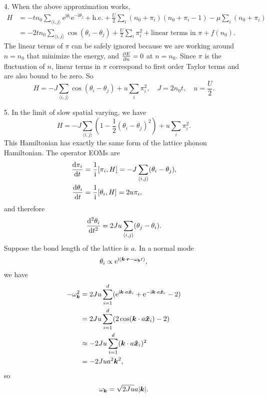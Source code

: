 \documentclass[hyperref, a4paper]{article}
\newcommand*{\ii}{\mathrm{i}}
\newcommand*{\ee}{\mathrm{e}}
\newcommand*{\pair}[1]{\langle #1 \rangle}
\begin{document}
\begin{itemize}
\item[4.] When the above approximation works, 
\[
    \begin{aligned}
        H &= - t n_0 \sum_{\pair{i, j}} \ee^{\ii \theta_i} \ee^{- \ii \theta_j} + \text{h.c.}
        + \frac{U}{2} \sum_i (n_0 + \pi_i) (n_0 + \pi_i - 1) - \mu \sum_i (n_0 + \pi_i) \\
        &= - 2 t n_0 \sum_{\pair{i, j}} \cos(\theta_i - \theta_j) 
        + \frac{U}{2} \sum_i \pi_i^2 + \text{linear terms in $\pi$} + f(n_0).
    \end{aligned}
\]
The linear terms of $\pi$ can be safely ignored 
because we are working around $n = n_0$ that minimize the energy,
and $\pdv{E}{n} = 0$ at $n = n_0$.
Since $\pi$ is the fluctuation of $n$,
linear terms in $\pi$ correspond to first order Taylor terms and are also bound to be zero.
So 
\begin{equation}
    H = - J \sum_{\pair{i, j}} \cos(\theta_i - \theta_j) 
    + u \sum_i \pi_i^2, \quad J = 2n_0 t, \quad u = \frac{U}{2}.
\end{equation}

\item[5.] In the limit of slow spatial varying,
we have 
\begin{equation}
    H = -J \sum_{\pair{i, j}} \left(1 - \frac{1}{2} (\theta_i - \theta_j)^2 \right) + u \sum_i \pi_i^2. 
\end{equation}
This Hamiltonian has exactly the same form of the lattice phonon Hamiltonian.
The operator EOMs are 
\begin{equation}
    \begin{aligned}
        \dv{\pi_i}{t} &= \frac{1}{\ii} \comm{\pi_i}{H} = 
        - J \sum_{\pair{i, j}} (\theta_i - \theta_j) , \\
        \dv{\theta_i}{t} &= \frac{1}{\ii} \comm{\theta_i}{H} = 2 u \pi_i,
    \end{aligned}
\end{equation}
and therefore 
\begin{equation}
    \dv[2]{\theta_i}{t} = 2 J u \sum_{\pair{i, j}} (\theta_j - \theta_i).
\end{equation}
Suppose the bond length of the lattice is $a$.
In a normal mode
\begin{equation}
    \theta_i \propto \ee^{\ii (\vb*{k} \cdot \vb*{r} - \omega_{\vb*{k}} t)},
\end{equation}
we have 
\[
    \begin{aligned}
        - \omega_{\vb*{k}}^2 &= 2 Ju \sum_{i=1}^d (
            \ee^{\ii \vb*{k} \cdot a \vu*{x}_i} + \ee^{- \ii \vb*{k} \cdot a \vu*{x}_i} - 2
        ) \\
        &= 2 J u\sum_{i=1}^d (2 \cos (\vb*{k} \cdot a \vu*{x}_i) - 2) \\
        &\approx - 2 J u \sum_{i=1}^d (\vb*{k} \cdot a \vu*{x}_i)^2 \\
        &= - 2 J u a^2 \vb*{k}^2,
    \end{aligned}
\]
so
\begin{equation}
    \omega_{\vb*{k}} = \sqrt{2 J u} a \abs{\vb*{k}}.
\end{equation}


\end{itemize}
\end{document}
